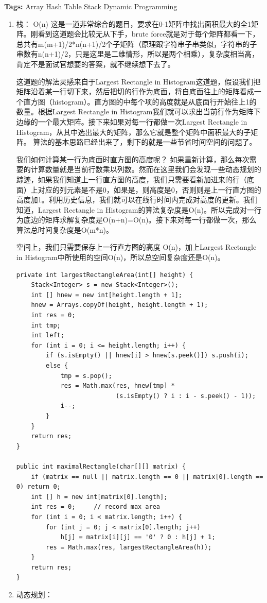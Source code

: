 \documentclass[12pt]{book}
\begin{document}
\textbf{Tags:} Array Hash Table Stack Dynamic Programming
\begin{enumerate}
\item 栈： O(n)
\label{sec-14-3-3-1}
这是一道非常综合的题目，要求在0-1矩阵中找出面积最大的全1矩阵。刚看到这道题会比较无从下手，brute force就是对于每个矩阵都看一下，总共有m(m+1)/2*n(n+1)/2个子矩阵（原理跟字符串子串类似，字符串的子串数有n(n+1)/2，只是这里是二维情形，所以是两个相乘），复杂度相当高，肯定不是面试官想要的答案，就不继续想下去了。

这道题的解法灵感来自于Largest Rectangle in Histogram这道题，假设我们把矩阵沿着某一行切下来，然后把切的行作为底面，将自底面往上的矩阵看成一个直方图（histogram）。直方图的中每个项的高度就是从底面行开始往上1的数量。根据Largest Rectangle in Histogram我们就可以求出当前行作为矩阵下边缘的一个最大矩阵。接下来如果对每一行都做一次Largest Rectangle in Histogram，从其中选出最大的矩阵，那么它就是整个矩阵中面积最大的子矩阵。
算法的基本思路已经出来了，剩下的就是一些节省时间空间的问题了。

我们如何计算某一行为底面时直方图的高度呢？ 如果重新计算，那么每次需要的计算数量就是当前行数乘以列数。然而在这里我们会发现一些动态规划的踪迹，如果我们知道上一行直方图的高度，我们只需要看新加进来的行（底面）上对应的列元素是不是0，如果是，则高度是0，否则则是上一行直方图的高度加1。利用历史信息，我们就可以在线行时间内完成对高度的更新。我们知道，Largest Rectangle in Histogram的算法复杂度是O(n)。所以完成对一行为底边的矩阵求解复杂度是O(n+n)=O(n)。接下来对每一行都做一次，那么算法总时间复杂度是O(m*n)。

空间上，我们只需要保存上一行直方图的高度 O(n)，加上Largest Rectangle in Histogram中所使用的空间O(n)，所以总空间复杂度还是O(n)。

\lstset{language=java,label= ,caption= ,numbers=none}
\begin{lstlisting}
private int largestRectangleArea(int[] height) {
    Stack<Integer> s = new Stack<Integer>();
    int [] hnew = new int[height.length + 1];
    hnew = Arrays.copyOf(height, height.length + 1);
    int res = 0; 
    int tmp;     
    int left;
    for (int i = 0; i <= height.length; i++) {
        if (s.isEmpty() || hnew[i] > hnew[s.peek()]) s.push(i);
        else {
            tmp = s.pop();
            res = Math.max(res, hnew[tmp] * 
                           (s.isEmpty() ? i : i - s.peek() - 1));
            i--;
        }
    }
    return res;
}

public int maximalRectangle(char[][] matrix) {
    if (matrix == null || matrix.length == 0 || matrix[0].length == 0) return 0;
    int [] h = new int[matrix[0].length];
    int res = 0;     // record max area
    for (int i = 0; i < matrix.length; i++) {
        for (int j = 0; j < matrix[0].length; j++) 
            h[j] = matrix[i][j] == '0' ? 0 : h[j] + 1;
        res = Math.max(res, largestRectangleArea(h));
    }
    return res;
}
\end{lstlisting}
\item 动态规划：
\label{sec-14-3-3-2}


\end{enumerate}
\end{document}
